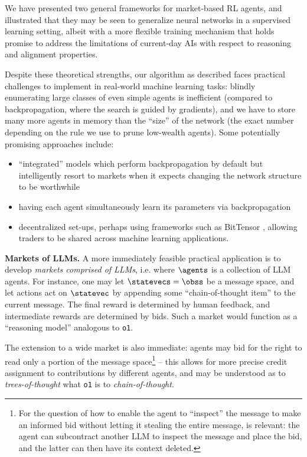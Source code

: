 We have presented two general frameworks for market-based RL agents, and illustrated that they may be seen to generalize neural networks in a supervised learning setting, albeit with a more flexible training mechanism that holds promise to address the limitations of current-day AIs with respect to reasoning and alignment properties.

Despite these theoretical strengths, our algorithm as described faces practical challenges to implement in real-world machine learning tasks: blindly enumerating large classes of even simple agents is inefficient (compared to backpropagation, where the search is guided by gradients), and we have to store many more agents in memory than the ``size'' of the network (the exact number depending on the rule we use to prune low-wealth agents). Some potentially promising approaches include:
\begin{itemize}
\item ``integrated'' models which perform backpropagation by default but intelligently resort to markets when it expects changing the network structure to be worthwhile
\item having each agent simultaneously learn its parameters via backpropagation
\item decentralized set-ups, perhaps using frameworks such as BitTensor \citep{raoBitTensorPeertoPeerIntelligence2021}, allowing traders to be shared across machine learning applications.
\end{itemize}

\textbf{Markets of LLMs.} A more immediately feasible practical application is to develop \emph{markets comprised of LLMs}, i.e. where $\agents$ is a collection of LLM agents. For instance, one may let $\statevecs=\obss$ be a message space, and let actions act on $\statevec$ by appending some ``chain-of-thought item'' to the current message. The final reward is determined by human feedback, and intermediate rewards are determined by bids. Such a market would function as a ``reasoning model'' analogous to \texttt{o1}.

The extension to a wide market is also immediate: agents may bid for the right to read only a portion of the message space\footnote{For the question of how to enable the agent to ``inspect'' the message to make an informed bid without letting it stealing the entire message, \citep{rahamanLanguageModelsCan2024} is relevant: the agent can subcontract another LLM to inspect the message and place the bid, and the latter can then have its context deleted.} -- this allows for more precise credit assignment to contributions by different agents, and may be understood as to \emph{trees-of-thought} \citep{yaoTreeThoughtsDeliberate2024} what \texttt{o1} is to \emph{chain-of-thought}.

